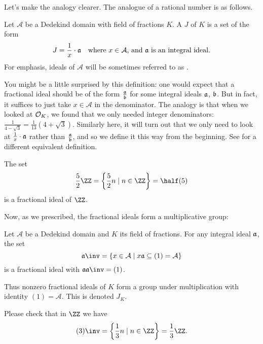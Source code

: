 Let's make the analogy clearer.
The analogue of a rational number is as follows.

\begin{definition}
	Let $\mathcal A$ be a Dedekind domain with field of fractions $K$.
	A  $J$ of $K$ is a set of the form 
	\[ J = \frac{1}{x} \cdot \aa \quad \text{where $x \in \mathcal A$, and $\aa$ is an integral ideal.} \]
	For emphasis, ideals of $\mathcal A$ will be sometimes referred to as .
\end{definition}

You might be a little surprised by this definition:
one would expect that a fractional ideal should be of the form $\frac{\aa}{\bb}$
for some integral ideals $\aa$, $\bb$.
But in fact, it suffices to just take $x \in \mathcal A$ in the denominator.
The analogy is that when we looked at $\OO_K$, we found that we only needed
integer denominators: $\frac{1}{4-\sqrt3} = \frac{1}{13}(4+\sqrt3)$.
Similarly here, it will turn out that we only need to look at $\frac1x \cdot \aa$
rather than $\frac{\aa}{\bb}$, and so we define it this way from the beginning.
See  for a different equivalent definition.

\begin{example}
	The set \[ \frac52 \ZZ = \left\{ \frac52n \mid n \in \ZZ \right\} = \half (5) \]
	is a fractional ideal of $\ZZ$.
\end{example}

Now, as we prescribed, the fractional ideals form a multiplicative group:
\begin{theorem}
	Let $\mathcal A$ be a Dedekind domain and $K$ its field of fractions.
	For any integral ideal $\aa$, the set
	\[ \aa\inv = \left\{ x \in \mathcal A
			\mid x\aa \subseteq (1) = \mathcal A \right\} \]
	is a fractional ideal with $\aa \aa\inv = (1)$.
\end{theorem}
\begin{definition}
	Thus nonzero fractional ideals of $K$ form a group under multiplication
	with identity $(1) = \mathcal A$.
	This  is denoted $J_K$.
\end{definition}

\begin{example}[$(3)\inv$ in $\ZZ$]
	Please check that in $\ZZ$ we have
	\[ (3)\inv = \left\{ \frac 13 n \mid n \in \ZZ \right\} = \frac 13 \ZZ. \]
\end{example}


